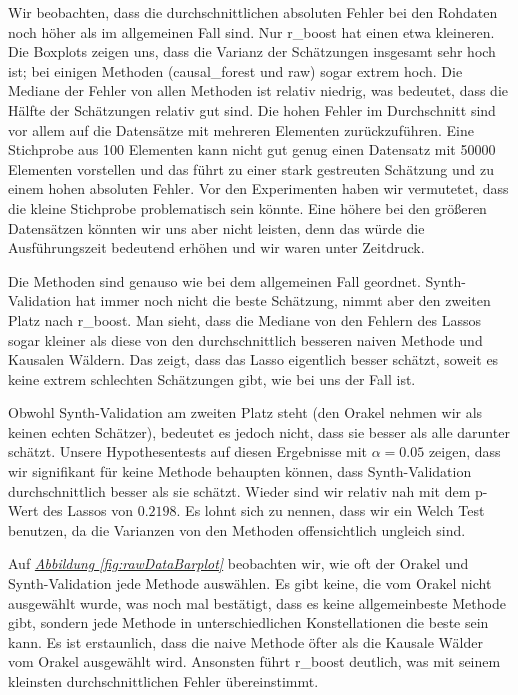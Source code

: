 \documentclass[12pt,a4paper,twoside]{scrartcl}
\numberwithin{equation}{section}
\newcommand{\reffig}[1]{\emph{\hyperref[#1]{Abbildung \ref*{#1}}}}
\begin{document}
\noindent 
Wir beobachten, dass die durchschnittlichen absoluten Fehler bei den Rohdaten noch höher als im allgemeinen Fall sind. Nur r\_boost hat einen etwa kleineren. Die Boxplots zeigen uns, dass die Varianz der Schätzungen insgesamt sehr hoch ist; bei einigen Methoden (causal\_forest und raw) sogar extrem hoch. Die Mediane der Fehler von allen Methoden ist relativ niedrig, was bedeutet, dass die Hälfte der Schätzungen relativ gut sind. Die hohen Fehler im Durchschnitt sind vor allem auf die Datensätze mit mehreren Elementen zurückzuführen. Eine Stichprobe aus 100 Elementen kann nicht gut genug  einen Datensatz mit 50000 Elementen vorstellen und das führt zu einer stark gestreuten Schätzung und zu einem hohen absoluten Fehler. Vor den Experimenten haben wir vermutetet, dass die kleine Stichprobe problematisch sein könnte. Eine höhere bei den größeren Datensätzen könnten wir uns aber nicht leisten, denn das würde die Ausführungszeit bedeutend erhöhen und wir waren unter Zeitdruck.\par

\noindent 
Die Methoden sind genauso wie bei dem allgemeinen Fall geordnet. Synth-Validation hat immer noch nicht die beste Schätzung, nimmt aber den zweiten Platz nach r\_boost. Man sieht, dass die Mediane von den Fehlern des Lassos sogar kleiner als diese von den durchschnittlich besseren naiven Methode und Kausalen Wäldern. Das zeigt, dass das Lasso eigentlich besser schätzt, soweit es keine extrem schlechten Schätzungen gibt, wie bei uns der Fall ist.\par

\noindent 
Obwohl Synth-Validation am zweiten Platz steht (den Orakel nehmen wir als keinen echten Schätzer), bedeutet es jedoch nicht, dass sie besser als alle darunter schätzt. Unsere Hypothesentests auf diesen Ergebnisse mit $\alpha = 0.05$ zeigen, dass wir signifikant für keine Methode behaupten können, dass Synth-Validation durchschnittlich besser als sie schätzt. Wieder sind wir relativ nah mit dem p-Wert des Lassos von $0.2198$. Es lohnt sich zu nennen, dass wir ein Welch Test benutzen, da die Varianzen von den Methoden offensichtlich ungleich sind.\par

\noindent
Auf \reffig{fig:rawDataBarplot} beobachten wir, wie oft der Orakel und Synth-Validation jede Methode auswählen. Es gibt keine, die vom Orakel nicht ausgewählt wurde, was noch mal bestätigt, dass es keine allgemeinbeste Methode gibt, sondern jede Methode in unterschiedlichen Konstellationen die beste sein kann. Es ist erstaunlich, dass die naive Methode öfter als die Kausale Wälder vom Orakel ausgewählt wird. Ansonsten führt r\_boost deutlich, was mit seinem kleinsten durchschnittlichen Fehler übereinstimmt.\par 
\end{document}

